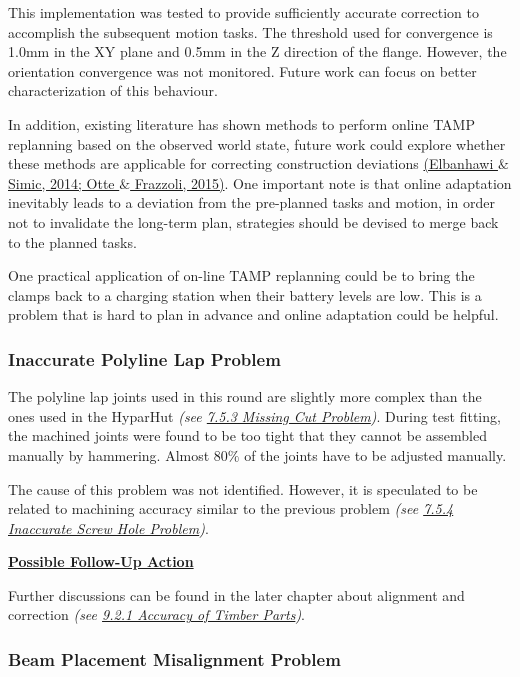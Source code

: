 \documentclass[11pt]{book}
\begin{document}
This implementation was tested to provide sufficiently accurate correction to accomplish the subsequent motion tasks. The threshold used for convergence is 1.0mm in the XY plane and 0.5mm in the Z direction of the flange. However, the orientation convergence was not monitored. Future work can focus on better characterization of this behaviour. 

In addition, existing literature has shown methods to perform online TAMP replanning based on the observed world state, future work could explore whether these methods are applicable for correcting construction deviations \href{https://www.zotero.org/google-docs/?D9mSau}{(Elbanhawi $\&$ Simic, 2014; Otte $\&$ Frazzoli, 2015)}. One important note is that online adaptation inevitably leads to a deviation from the pre-planned tasks and motion, in order not to invalidate the long-term plan, strategies should be devised to merge back to the planned tasks.

One practical application of on-line TAMP replanning could be to bring the clamps back to a charging station when their battery levels are low. This is a problem that is hard to plan in advance and online adaptation could be helpful. 

\subsubsection{Inaccurate Polyline Lap Problem}

The polyline lap joints used in this round are slightly more complex than the ones used in the HyparHut \textit{(see \uline{7.5.3 Missing Cut Problem})}. During test fitting, the machined joints were found to be too tight that they cannot be assembled manually by hammering. Almost 80$\%$ of the joints have to be adjusted manually. 

The cause of this problem was not identified. However, it is speculated to be related to machining accuracy similar to the previous problem \textit{(see \uline{7.5.4 Inaccurate Screw Hole Problem})}.

\textbf{\uline{Possible Follow-Up Action}}

Further discussions can be found in the later chapter about alignment and correction \textit{(see \uline{9.2.1 Accuracy of Timber Parts})}.

\subsubsection{Beam Placement Misalignment Problem}
\end{document}
